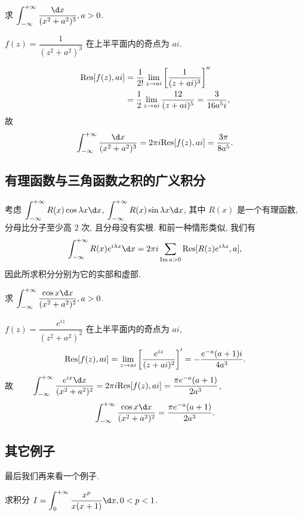 \begin{example}
	求 $\displaystyle\int_{-\infty}^{+\infty}\frac{\d x}{(x^2+a^2)^3},a>0$.
\end{example}

\begin{solution}
	$f(z)=\dfrac1{(z^2+a^2)^3}$ 在上半平面内的奇点为 $ai$.

	{
		\begin{align*}
		{\mathrm{Res}}[f(z),ai]&=\frac1{2!}\lim_{z\to ai}\left[\frac1{(z+ai)^3}\right]''\\
		&=\frac{1}{2}\lim_{z\to ai}\frac{12}{(z+ai)^5}=\frac{3}{16a^5i},
		\end{align*}故
		\[\int_{-\infty}^{+\infty}\frac{\d x}{(x^2+a^2)^3}
	=2\pi i\Res[f(z),ai]=\frac{3\pi}{8a^5}.\]
	}
\end{solution}

\subsection{有理函数与三角函数之积的广义积分}

考虑 $\displaystyle\int_{-\infty}^{+\infty}R(x)\cos{\lambda x}\d x$, $\displaystyle\int_{-\infty}^{+\infty}R(x)\sin{\lambda x}\d x$, 其中 $R(x)$ 是一个有理函数, 分母比分子至少高 $2$ 次, 且分母没有实根.
和前一种情形类似, 我们有
	\[\int_{-\infty}^{+\infty}R(x)e^{i\lambda x}\d x
	=2\pi i\sum_{\Im a>0}\Res[R(z)e^{i\lambda z},a],\]
因此所求积分分别为它的实部和虚部.


\begin{example}
	求 $\displaystyle\int_{-\infty}^{+\infty}\frac{\cos x\d x}{(x^2+a^2)^2}, a>0$.
\end{example}

\begin{solution}
	$f(z)=\dfrac{e^{iz}}{(z^2+a^2)^2}$ 在上半平面内的奇点为 $ai$,
	{
		\[{\mathrm{Res}}[f(z),ai]=\lim_{z\to ai}\left[\frac{e^{iz}}{(z+ai)^2}\right]'=-\frac{e^{-a}(a+1)i}{4a^3}.\]故
		$\displaystyle\qquad \int_{-\infty}^{+\infty}\frac{e^{ix}\d x}{(x^2+a^2)^2}=2\pi i \Res[f(z),ai]=\frac{\pi e^{-a}(a+1)}{2a^3}$,
		\[\int_{-\infty}^{+\infty}\frac{\cos x\d x}{(x^2+a^2)^2}=\frac{\pi e^{-a}(a+1)}{2a^3}.\]
	}
\end{solution}

\subsection{其它例子}

最后我们再来看一个例子.

\begin{example}
	求积分 $I=\displaystyle\int_0^{+\infty}\frac{x^p}{x(x+1)}\d x,0<p<1$.
\end{example}

